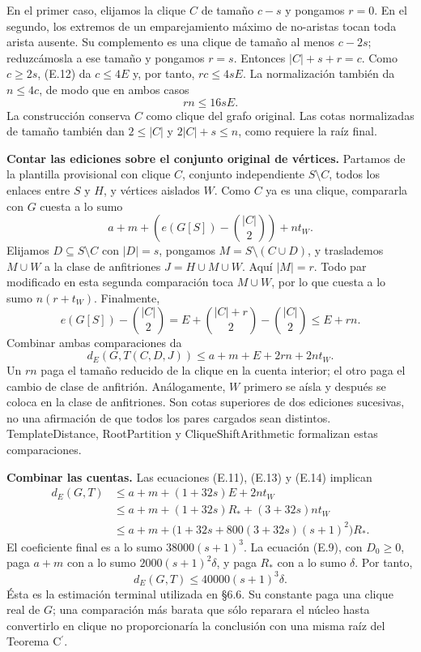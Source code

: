 \documentclass[spanish,11pt,a4paper]{article}
\begin{document}
En el primer caso, elijamos la clique \(C\) de tamaño \(c-s\) y pongamos \(r=0\). En el segundo, los extremos de un emparejamiento máximo de no-aristas tocan toda arista ausente. Su complemento es una clique de tamaño al menos \(c-2s\); reduzcámosla a ese tamaño y pongamos \(r=s\). Entonces \(|C|+s+r=c\). Como \(c\ge2s\), (E.12) da \(c\le4E\) y, por tanto, \(rc\le4sE\). La normalización también da \(n\le4c\), de modo que en ambos casos \[
rn\le16sE.
\tag{E.13}
\] La construcción conserva \(C\) como clique del grafo original. Las cotas normalizadas de tamaño también dan \(2\le|C|\) y \(2|C|+s\le n\), como requiere la raíz final.

\textbf{Contar las ediciones sobre el conjunto original de vértices.} Partamos de la plantilla provisional con clique \(C\), conjunto independiente \(S\setminus C\), todos los enlaces entre \(S\) y \(H\), y vértices aislados \(W\). Como \(C\) ya es una clique, compararla con \(G\) cuesta a lo sumo \[
a+m+\left(e(G[S])-\binom{|C|}{2}\right)+nt_W.
\] Elijamos \(D\subseteq S\setminus C\) con \(|D|=s\), pongamos \(M=S\setminus(C\cup D)\), y traslademos \(M\cup W\) a la clase de anfitriones \(J=H\cup M\cup W\). Aquí \(|M|=r\). Todo par modificado en esta segunda comparación toca \(M\cup W\), por lo que cuesta a lo sumo \(n(r+t_W)\). Finalmente, \[
e(G[S])-\binom{|C|}{2}
=E+\binom{|C|+r}{2}-\binom{|C|}{2}
\le E+rn.
\] Combinar ambas comparaciones da \[
d_E(G,T(C,D,J))\le a+m+E+2rn+2nt_W.
\tag{E.14}
\] Un \(rn\) paga el tamaño reducido de la clique en la cuenta interior; el otro paga el cambio de clase de anfitrión. Análogamente, \(W\) primero se aísla y después se coloca en la clase de anfitriones. Son cotas superiores de dos ediciones sucesivas, no una afirmación de que todos los pares cargados sean distintos. {\ttfamily\small TemplateDist\discretionary{\hbox{\ensuremath{\hookrightarrow}}}{}{}ance}, {\ttfamily\small RootPartitio\discretionary{\hbox{\ensuremath{\hookrightarrow}}}{}{}n} y {\ttfamily\small CliqueShiftA\discretionary{\hbox{\ensuremath{\hookrightarrow}}}{}{}rithmetic} formalizan estas comparaciones.

\textbf{Combinar las cuentas.} Las ecuaciones (E.11), (E.13) y (E.14) implican \[
\begin{aligned}
d_E(G,T)&\le a+m+(1+32s)E+2nt_W\\
&\le a+m+(1+32s)R_*+(3+32s)nt_W\\
&\le a+m+\bigl(1+32s+800(3+32s)(s+1)^2\bigr)R_*.
\end{aligned}
\] El coeficiente final es a lo sumo \(38000(s+1)^3\). La ecuación (E.9), con \(D_0\ge0\), paga \(a+m\) con a lo sumo \(2000(s+1)^2\delta\), y paga \(R_*\) con a lo sumo \(\delta\). Por tanto, \[
d_E(G,T)\le40000(s+1)^3\delta.
\] Ésta es la estimación terminal utilizada en §6.6. Su constante paga una clique real de \(G\); una comparación más barata que sólo reparara el núcleo hasta convertirlo en clique no proporcionaría la conclusión con una misma raíz del Teorema \texorpdfstring{C\ensuremath{^{\prime}}}{C'}.
\end{document}
